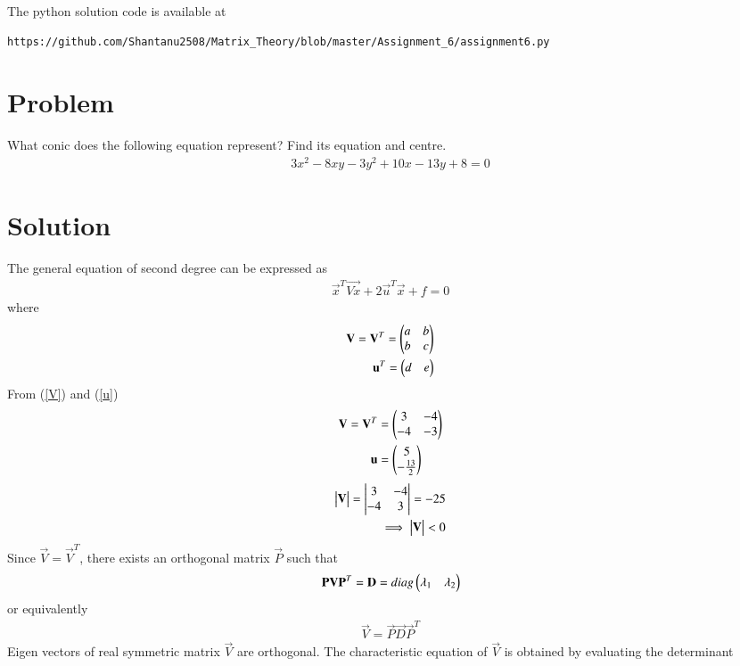 \documentclass[journal,12pt,twocolumn]{IEEEtran}
\begin{document}
The python solution code is available at
\begin{lstlisting}
https://github.com/Shantanu2508/Matrix_Theory/blob/master/Assignment_6/assignment6.py
\end{lstlisting}

\section{Problem}
What conic does the following equation represent? Find its equation and centre.
\begin{align*}
	3x^2 - 8xy - 3y^2 + 10x - 13y + 8 =0 
\end{align*}

\section{Solution}
The general equation of second degree can be expressed as
\begin{align}
	\vec{x}^{T}\vec{Vx} + 2\vec{u}^{T}\vec{x} + f=0   \label{stdsecdeg}
\end{align}
where
\begin{align}
        \vec{V}=\vec{V}^T=\myvec{a & b \\ b & c}   \label{V}  \\
        \vec{u}^T=\myvec{d &  e}            \label{u}
\end{align}
From (\ref{V}) and (\ref{u})
\begin{align}
	\mathbf{V}=\mathbf{V}^T &= \begin{pmatrix}3 & -4 \\ -4 & -3\end{pmatrix} \\
	\mathbf{u} &= \begin{pmatrix}5 \\ -\frac{13}{2}\end{pmatrix}
\end{align}
\begin{align}
	\mydet{\vec{V}}=\mydet{3 & -4 \\ -4 & 3} =-25 \\
	\implies \mydet{\vec{V}} < 0       \label{detless0}
\end{align}
Since $ \vec{V} = \vec{V}^T $, there exists an orthogonal matrix $\vec{P}$ such that
\begin{align}
	\mathbf{P}\mathbf{V}\mathbf{P}^T = \mathbf{D} = diag\begin{pmatrix}\lambda_1 & \lambda_2\end{pmatrix}
\end{align}
or equivalently 
\begin{align}
	\vec{V} = \vec{P}\vec{D}\vec{P}^T
\end{align}
Eigen vectors of real symmetric matrix $\vec{V}$ are orthogonal. The characteristic equation of $\vec{V}$ is obtained by evaluating the determinant
\end{document}
